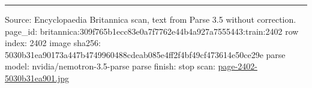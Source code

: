 \documentclass[10pt]{article}
\begin{document}
\vfill\par\noindent\rule{\linewidth}{0.4pt}\par
{\scriptsize\color{gray}\noindent Source: Encyclopaedia Britannica scan, text from Parse 3.5 without correction. page\_id: britannica:309f765b1ecc83e0a7f7762e44b4a927a7555443:train:2402 \quad row index: 2402 \quad image sha256: 5030b31ea90173a447b4749960488cdeab085e4ff2f4bf49cf473614e50ce29e \quad parse model: nvidia/nemotron-3.5-parse \quad parse finish: stop \quad scan: \href{../scans/page-2402-5030b31ea901.jpg}{page-2402-5030b31ea901.jpg}\par}
\end{document}
